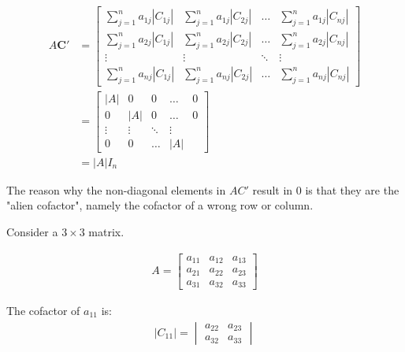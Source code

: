 \documentclass[10pt,a4paper]{book}
\theoremstyle{definition}\newtheorem{definition}{Definition}
\theoremstyle{definition}\newtheorem{fact}{Fact}
\theoremstyle{definition}\newtheorem{ex}{Ex.}
\theoremstyle{definition}\newtheorem{project}{Project}
\theoremstyle{definition}\newtheorem{problem}{Problem}
\theoremstyle{definition}\newtheorem{example}{Example}
\numberwithin{theorem}{chapter}
\numberwithin{corollary}{chapter}
\numberwithin{assumption}{chapter}
\numberwithin{definition}{chapter}
\numberwithin{prop}{chapter}
\numberwithin{notation}{chapter}
\numberwithin{problem}{chapter}
\numberwithin{example}{chapter}
\numberwithin{fact}{chapter}
\numberwithin{ex}{chapter}
\def\C{\mathbf C}
\begin{document}
	\begin{align}
		A \C' &= \begin{bmatrix}
			\sum_{j=1}^{n} a_{1j}|C_{1j}| & \sum_{j=1}^{n} a_{1j}|C_{2j}| & \dots & \sum_{j=1}^{n}a_{1j}|C_{nj}| \\
			\sum_{j=1}^{n} a_{2j}|C_{1j}| & \sum_{j=1}^{n} a_{2j}|C_{2j}| & \dots & \sum_{j=1}^{n}a_{2j}|C_{nj}| \\
			\vdots & \vdots & \ddots & \vdots \\
			\sum_{j=1}^{n} a_{nj}|C_{1j}| & \sum_{j=1}^{n} a_{nj}|C_{2j}| & \dots & \sum_{j=1}^{n}a_{nj}|C_{nj}|
		\end{bmatrix} \nonumber \\
		& = \begin{bmatrix}
			|A| & 0   & 0 & \dots & 0 \\
			0   & |A| & 0 & \dots & 0 \\
			\vdots & \vdots & \ddots & \vdots \\
			0 & 0 & \dots & |A|
		\end{bmatrix} \nonumber \\
		&= |A| I_n \label{eq:inverse_formula}
	\end{align}
	
	
	
	The reason why the non-diagonal elements in $ AC' $ result in 0 is that they are the "alien cofactor", namely the cofactor of a wrong row or column.
	
	Consider a $3 \times 3$ matrix.
	
	\begin{align*}
		A = \begin{bmatrix}
			a_{11} & a_{12} & a_{13} \\
			a_{21} & a_{22} & a_{23} \\
			a_{31} & a_{32} & a_{33} 
		\end{bmatrix}
	\end{align*}
	
	The cofactor of $ a_{11} $ is: 
	\begin{align*}
		|C_{11}| = \begin{vmatrix} a_{22} & a_{23} \\ a_{32} & a_{33} \end{vmatrix}
	\end{align*}
	
\end{document}
